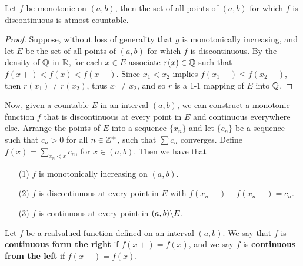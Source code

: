 \begin{theorem}\label{5.6.2}
    Let $f$ be monotonic on  $(a,b)$, then the set of all  points of $(a,b)$ for which
    $f$ is  discontinuous is atmost countable.
\end{theorem}
\begin{proof}
    Suppose, without loss of generality that $g$ is monotonically increasing, and let  $E$
    be the set of all points of  $(a,b)$ for which  $f$ is discontinuous. By the density of
    $\mathbb{Q}$ in  $\mathbb{R}$, for each $x \in E$ associate $r(x) \in \mathbb{Q}$ such that $f(x+)<f(x)<f(x-)$.
    Since  $x_1 < x_2$ implies $f(x_1+) \leq f(x_2-)$, then $r(x_1) \neq r(x_2)$, thus
    $x_1 \neq x_2$, and so $r$ is a 1-1 mapping of  $E$ into  $\mathbb{Q}$.
\end{proof}

Now, given a countable $E$ in an interval  $(a,b)$, we can construct a monotonic function $f$ that
is discontinuous at every point in  $E$ and continuous everywhere else. Arrange  the points of
$E$ into a sequence  $\{x_n\}$ and let  $\{c_n\}$ be a sequence such that  $c_n>0$ for
all  $n \in \mathbb{Z}^+$, such that  $\sum{c_n}$ converges. Define  $f(x)=\sum_{x_n<x}{c_n}$, for
$x \in (a,b)$. Then we have that
    \begin{enumerate}
        \item[(1)] $f$ is monotonically increasing on $(a,b)$.

        \item[(2)] $f$ is discontinuous at every point in $E$ with $f(x_n+)-f(x_n-)=c_n$.

        \item[(3)] $f$ is continuous at every point in $(a,b) \backslash E$.
    \end{enumerate}

\begin{definition}
    Let $f$ be a realvalued function defined on an interval $(a,b)$. We say that $f$ is
    \textbf{continuous form the right} if $f(x+)=f(x)$, and we say $f$ is \textbf{continuous from the
    left} if $f(x-)=f(x)$.
\end{definition}
